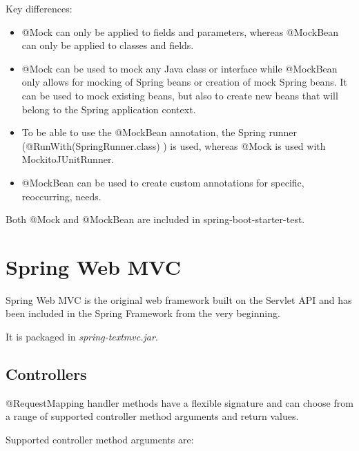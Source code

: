 \documentclass{scrartcl}
\begin{document}
Key differences:

\begin{itemize}
    \item @Mock can only be applied to fields and parameters, whereas @MockBean can only be applied to classes and fields.
    \item @Mock can be used to mock any Java class or interface while @MockBean only allows for mocking of Spring beans or creation of mock Spring beans. It can be used to mock existing beans, but also to create new beans that will belong to the Spring application context.
    \item To be able to use the @MockBean annotation, the Spring runner (@RunWith(SpringRunner.class) ) is used, whereas @Mock is used with MockitoJUnitRunner.
    \item @MockBean can be used to create custom annotations for specific, reoccurring, needs.
\end{itemize}

Both @Mock and @MockBean are included in spring-boot-starter-test.

\section{Spring Web MVC}

Spring Web MVC is the original web framework built on the Servlet API and has been included in the Spring Framework from the very beginning.

It is packaged in \textit{spring-textmvc.jar}.

\subsection{Controllers}

    @RequestMapping handler methods have a flexible signatu\texttt{}re and can choose from a range of supported controller method arguments and return values.

    Supported controller method arguments are:
\end{document}
